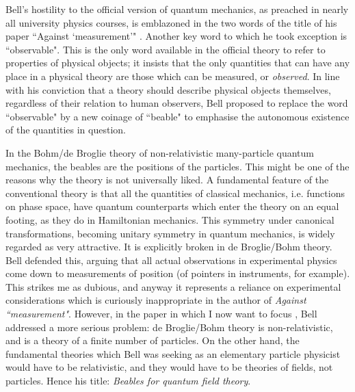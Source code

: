 \documentclass[12pt,reqno]{article}
\renewcommand{\(}{\left(}
\renewcommand{\)}{\right)}
\renewcommand{\.}{\centerdot}
\newcommand{\1}{\mathbf{1}}
\newcommand{\<}{\langle}
\renewcommand{\>}{\rangle}
\theoremstyle{definition}
\theoremstyle{remark}
\numberwithin{equation}{section}
\begin{document}
Bell's hostility to the official version of quantum mechanics, as preached in nearly all university physics courses, is emblazoned in the two words of the title of his paper ``Against `measurement'" \cite{Bell:piddling}. Another key word to which he took exception is ``observable". This is the only word available in the official theory to refer to properties of physical objects; it insists that the only quantities that can have any place in a physical theory are those which can be measured, or \emph{observed}. In line with his conviction that a theory should describe physical objects themselves, regardless of their relation to human observers, Bell proposed \cite{Bell:subjobj} to replace the word ``observable" by a new coinage of ``beable"
 to emphasise the autonomous existence of the quantities in question. 

In the Bohm/de Broglie theory of non-relativistic many-particle quantum mechanics, the beables are the positions of the particles. This might be one of the reasons why the theory is not universally liked. A fundamental feature of the conventional theory is that all the quantities of classical mechanics, i.e. functions on phase space, have quantum counterparts which enter the theory on an equal footing, as they do in Hamiltonian mechanics. This symmetry under canonical transformations, becoming unitary symmetry in quantum mechanics, is widely regarded as very attractive. It is explicitly broken in de Broglie/Bohm theory. Bell defended this, arguing that all actual observations in experimental physics come down to measurements of position (of pointers in instruments, for example). This strikes me as dubious, and anyway it represents a reliance on experimental considerations which is curiously inappropriate in the author of \emph{Against ``measurement"}. However, in the paper in which I now want to focus \cite{Bell:beables}, Bell addressed a more serious problem: de Broglie/Bohm theory is non-relativistic, and is a theory of a finite number of particles. On the other hand, the fundamental theories which Bell was seeking as an elementary particle physicist would have to be relativistic, and they would have to be theories of fields, not particles. Hence his title: \emph{Beables for quantum field theory}.
\end{document}
